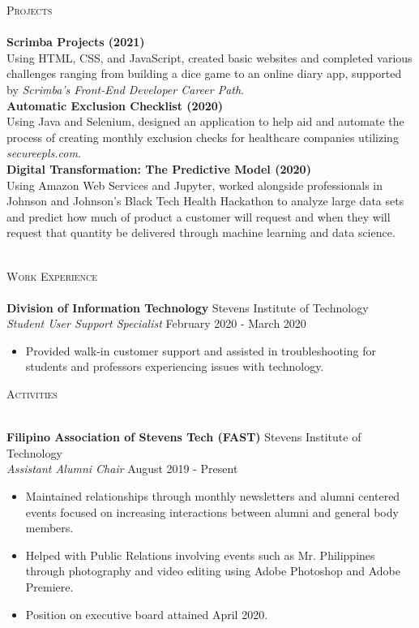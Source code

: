 \documentclass[10pt]{article}
\newcommand{\lineunder} {
    \vspace*{-8pt} \\
    \hspace*{-18pt} \hrulefill \\
}
\newcommand{\header} [1] {
    {\hspace*{-18pt}\vspace*{6pt} \textsc{#1}}
    \vspace*{-6pt} \lineunder
}
\begin{document}
\header{Projects}
{\textbf{Scrimba Projects (2021)}} \hfill 
\\
Using HTML, CSS, and JavaScript, created basic websites and completed various challenges ranging from building a dice game to an online diary app, supported by \textit{Scrimba's Front-End Developer Career Path}. \\
\vspace*{2mm}
{\textbf{Automatic Exclusion Checklist (2020)}} \hfill 
\\
Using Java and Selenium, designed an application to help aid and automate the process of creating monthly exclusion checks for healthcare companies utilizing \textit{secureepls.com}.\\
\vspace*{2mm}
{\textbf{Digital Transformation: The Predictive Model (2020)}} \hfill 
\\
Using Amazon Web Services and Jupyter, worked alongside professionals in Johnson and Johnson's Black Tech Health Hackathon to analyze large data sets and predict how much of product a customer will request and when they will request that quantity be delivered through machine learning and data science.\\
\vspace*{2mm}
\
\header{Work Experience}
\vspace{1mm}
\textbf{Division of Information Technology} \hfill Stevens Institute of Technology\\
\textit{Student User Support Specialist} \hfill February 2020 - March 2020\\
\vspace{-1mm}
\begin{itemize} \itemsep 1pt
	\item Provided walk-in customer support and assisted in troubleshooting for students and professors experiencing issues with technology.
\end{itemize}

\header{Activities}
\vspace{1mm}

\textbf{Filipino Association of Stevens Tech (FAST)} \hfill Stevens Institute of Technology\\
\textit{Assistant Alumni Chair} \hfill August 2019 - Present\\
\vspace{-1mm}
\begin{itemize} \itemsep 1pt
	\item Maintained relationships through monthly newsletters and alumni centered events focused on increasing interactions between alumni and general body members.
	\item Helped with Public Relations involving events such as Mr. Philippines through photography and video editing using Adobe Photoshop and Adobe Premiere.
	\item Position on executive board attained April 2020.
\end{itemize}
\end{document}
